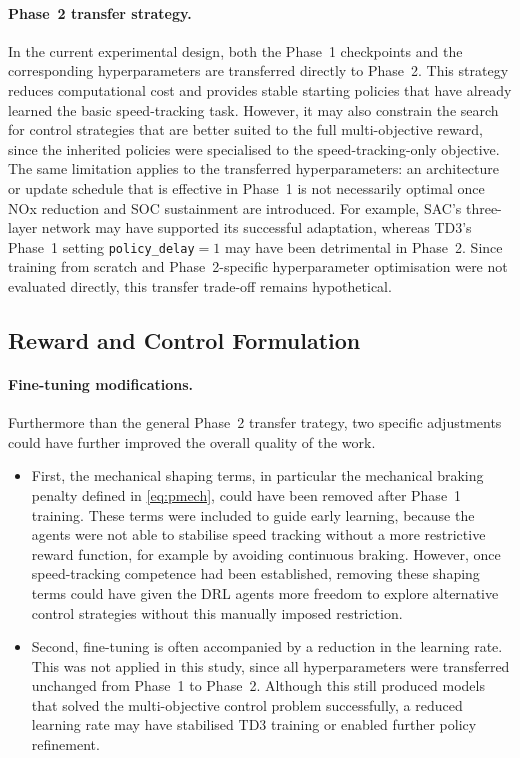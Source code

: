 \paragraph{Phase~2 transfer strategy.} In the current experimental design, both the Phase~1 checkpoints and the corresponding hyperparameters are transferred directly to Phase~2. This strategy reduces computational cost and provides stable starting policies that have already learned the basic speed-tracking task. However, it may also constrain the search for control strategies that are better suited to the full multi-objective reward, since the inherited policies were specialised to the speed-tracking-only objective. The same limitation applies to the transferred hyperparameters: an architecture or update schedule that is effective in Phase~1 is not necessarily optimal once \ac{NOx} reduction and \ac{SOC} sustainment are introduced. For example, SAC's three-layer network may have supported its successful adaptation, whereas TD3's Phase~1 setting \texttt{policy\_delay}$=1$ may have been detrimental in Phase~2. Since training from scratch and Phase~2-specific hyperparameter optimisation were not evaluated directly, this transfer trade-off remains hypothetical.

\subsection{Reward and Control Formulation}

\paragraph{Fine-tuning modifications.} Furthermore than the general Phase~2 transfer trategy, two specific adjustments could have further improved the overall quality of the work.

\begin{itemize}
  \item First, the mechanical shaping terms, in particular the mechanical braking penalty defined in \autoref{eq:pmech}, could have been removed after Phase~1 training. These terms were included to guide early learning, because the agents were not able to stabilise speed tracking without a more restrictive reward function, for example by avoiding continuous braking. However, once speed-tracking competence had been established, removing these shaping terms could have given the \ac{DRL} agents more freedom to explore alternative control strategies without this manually imposed restriction.
  \item Second, fine-tuning is often accompanied by a reduction in the learning rate. This was not applied in this study, since all hyperparameters were transferred unchanged from Phase~1 to Phase~2. Although this still produced models that solved the multi-objective control problem successfully, a reduced learning rate may have stabilised TD3 training or enabled further policy refinement.
\end{itemize}

